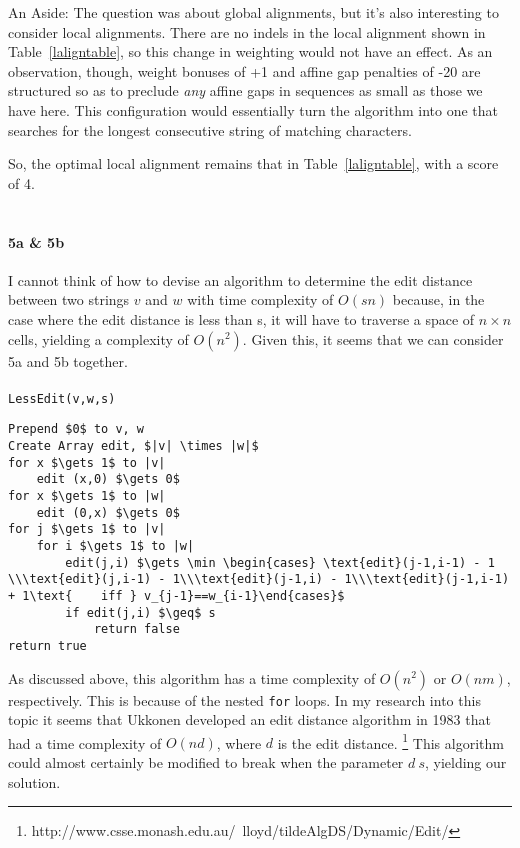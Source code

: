 \documentclass[12pt]{amsart}
\begin{document}
An Aside:
The question was about global alignments, but it's also interesting to consider local alignments.  There are no indels in the local alignment shown in Table~\ref{laligntable}, so this change in weighting would not have an effect.  As an observation, though, weight bonuses of +1 and affine gap penalties of -20 are structured so as to preclude \textit{any} affine gaps in sequences as small as those we have here.  This configuration would essentially turn the algorithm into one that searches for the longest consecutive string of matching characters.

So, the optimal local alignment remains that in Table~\ref{laligntable}, with a score of 4.
\clearpage
\section{}  
\paragraph{5a \& 5b}I cannot think of how to devise an algorithm to determine the edit distance between two strings $v$ and $w$ with time complexity of $O(sn)$ because, in the case where the edit distance is less than s, it will have to traverse a space of $n \times n$ cells, yielding a complexity of $O(n^2)$.  
Given this, it seems that we can consider 5a and 5b together. \\
 \\
 
\lstinline{LessEdit(v,w,s)}
\begin{lstlisting}[mathescape=true]
Prepend $0$ to v, w
Create Array edit, $|v| \times |w|$
for x $\gets 1$ to |v|
	edit (x,0) $\gets 0$
for x $\gets 1$ to |w|
	edit (0,x) $\gets 0$
for j $\gets 1$ to |v|
	for i $\gets 1$ to |w|
		edit(j,i) $\gets \min \begin{cases} \text{edit}(j-1,i-1) - 1 \\\text{edit}(j,i-1) - 1\\\text{edit}(j-1,i) - 1\\\text{edit}(j-1,i-1) + 1\text{    iff } v_{j-1}==w_{i-1}\end{cases}$
		if edit(j,i) $\geq$ s
			return false
return true
\end{lstlisting}
As discussed above, this algorithm has a time complexity of $O(n^2)$ or $O(nm)$, respectively.  This is because of the nested \lstinline{for} loops.
In my research into this topic it seems that Ukkonen developed an edit distance algorithm in 1983 that had a time complexity of $O(nd)$, where $d$ is the edit distance.  \footnote{http://www.csse.monash.edu.au/~lloyd/tildeAlgDS/Dynamic/Edit/}  This algorithm could almost certainly be modified to break when the parameter $d \> s$, yielding our solution. 
\end{document}
